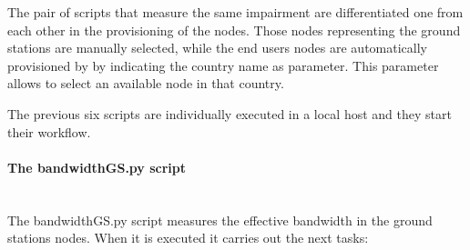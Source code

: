 The pair of scripts that measure the same impairment are differentiated one from each other in the provisioning of the nodes. Those nodes representing the ground stations are manually selected, while the end users nodes are automatically provisioned by \nepi by indicating the country name as parameter. This parameter allows \nepi to select an available node in that country. 

The previous six scripts are individually executed in a local host and they start their workflow.

\paragraph{The bandwidthGS.py script}~\\

The bandwidthGS.py  script measures the effective bandwidth in the ground
stations nodes. When it is executed it carries out the next tasks:
